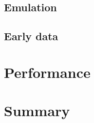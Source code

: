\subsection{Emulation}

\subsection{Early data}


\clearpage
\section{Performance}



\clearpage
\section{Summary}

